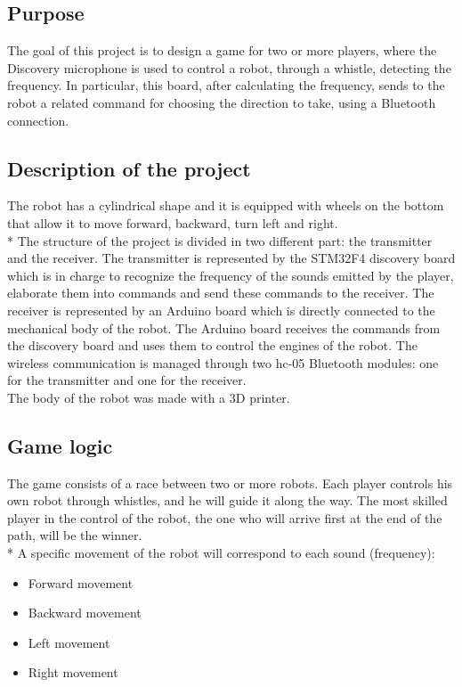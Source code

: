 \subsection{Purpose}
The goal of this project is to design a game for two or more players, where the Discovery microphone is used to control a robot, through a whistle, detecting the frequency. In particular, this board, after calculating the frequency, sends to the robot a related command for choosing the direction to take, using a Bluetooth connection.

\subsection{Description of the project}
The robot has a cylindrical shape and it is equipped with wheels on the bottom that allow it to move forward, backward, turn left and right.\\*
The structure of the project is divided in two different part: the transmitter and the receiver.
The transmitter is represented by the STM32F4 discovery board which is in charge to recognize the frequency of the sounds emitted by the player, elaborate them into commands and send these commands to the receiver.
The receiver is represented by an Arduino board which is directly connected to the mechanical body of the robot. The Arduino board receives the commands from the discovery board and uses them to control the engines of the robot.
The wireless communication is managed through two hc-05 Bluetooth modules: one for the transmitter and one for the receiver.\\
The body of the robot was made with a 3D printer.

\subsection{Game logic}
The game consists of a race between two or more robots. Each player controls his own robot through whistles, and he will guide it along the way. The most skilled player in the control of the robot, the one who will arrive first at the end of the path, will be the winner.\\*
A specific movement of the robot will correspond to each sound (frequency):
\begin{itemize}
	\item Forward movement
	\item Backward movement
	\item Left movement
	\item Right movement
\end{itemize}

